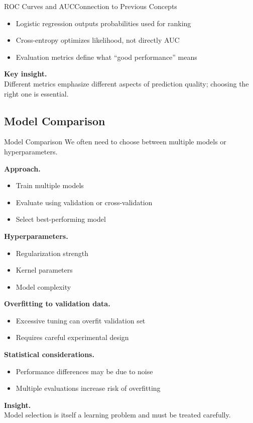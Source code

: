 \documentclass[aspectratio=169,11pt]{beamer}
\begin{document}
\begin{frame}[t,allowframebreaks]{ROC Curves and AUC}{Connection to Previous Concepts}
\small
\begin{itemize}
    \item Logistic regression outputs probabilities used for ranking
    \item Cross-entropy optimizes likelihood, not directly AUC
    \item Evaluation metrics define what ``good performance'' means
\end{itemize}

\textbf{Key insight.}\\ Different metrics emphasize different aspects of prediction quality; choosing the right one is essential.
\end{frame}

\subsection{Model Comparison}
\begin{frame}[t,allowframebreaks]{Model Comparison}
\small
We often need to choose between multiple models or hyperparameters.

\textbf{Approach.}\\ \begin{itemize}
    \item Train multiple models
    \item Evaluate using validation or cross-validation
    \item Select best-performing model
\end{itemize}

\textbf{Hyperparameters.}\\ \begin{itemize}
    \item Regularization strength
    \item Kernel parameters
    \item Model complexity
\end{itemize}

\textbf{Overfitting to validation data.}\\ \begin{itemize}
    \item Excessive tuning can overfit validation set
    \item Requires careful experimental design
\end{itemize}

\textbf{Statistical considerations.}\\ \begin{itemize}
    \item Performance differences may be due to noise
    \item Multiple evaluations increase risk of overfitting
\end{itemize}

\textbf{Insight.}\\ Model selection is itself a learning problem and must be treated carefully.
\end{frame}
\end{document}
